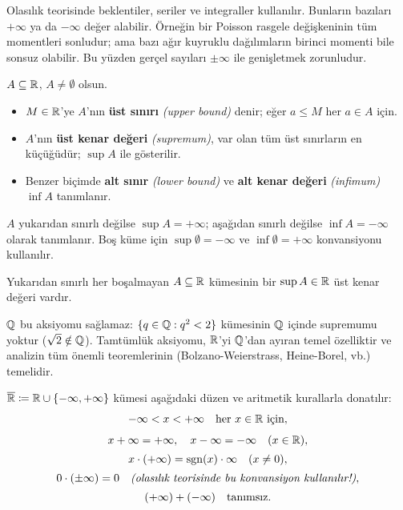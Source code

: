 \begin{motivasyon}[§0.4]
Olasılık teorisinde beklentiler, seriler ve integraller kullanılır. Bunların
bazıları $+\infty$ ya da $-\infty$ değer alabilir. Örneğin bir Poisson rasgele
değişkeninin tüm momentleri sonludur; ama bazı ağır kuyruklu dağılımların birinci
momenti bile sonsuz olabilir. Bu yüzden gerçel sayıları $\pm\infty$ ile
genişletmek zorunludur.
\end{motivasyon}

\begin{tanim}\label{def:supinf}
$A \subseteq \mathbb{R}$, $A \neq \emptyset$ olsun.
\begin{itemize}
  \item $M \in \mathbb{R}$'ye $A$'nın \textbf{üst sınırı} \emph{(upper bound)} denir;
        eğer $a \leq M$ her $a \in A$ için.
  \item $A$'nın \textbf{üst kenar değeri} \emph{(supremum)}, var olan tüm üst
        sınırların en küçüğüdür; $\sup A$ ile gösterilir.
  \item Benzer biçimde \textbf{alt sınır} \emph{(lower bound)} ve
        \textbf{alt kenar değeri} \emph{(infimum)} $\inf A$ tanımlanır.
\end{itemize}
$A$ yukarıdan sınırlı değilse $\sup A = +\infty$; aşağıdan sınırlı değilse
$\inf A = -\infty$ olarak tanımlanır. Boş küme için $\sup \emptyset = -\infty$
ve $\inf \emptyset = +\infty$ konvansiyonu kullanılır.
\end{tanim}

\begin{aksiyom}
\label{ax:tamtumluk}
Yukarıdan sınırlı her boşalmayan $A \subseteq \mathbb{R}$ kümesinin bir
$\sup A \in \mathbb{R}$ üst kenar değeri vardır.
\end{aksiyom}

\begin{notkutu}
$\mathbb{Q}$ bu aksiyomu sağlamaz: $\{q \in \mathbb{Q} : q^2 < 2\}$ kümesinin
$\mathbb{Q}$ içinde supremumu yoktur ($\sqrt{2} \notin \mathbb{Q}$).
Tamtümlük aksiyomu, $\mathbb{R}$'yi $\mathbb{Q}$'dan ayıran temel özelliktir ve
analizin tüm önemli teoremlerinin (Bolzano-Weierstrass, Heine-Borel, vb.) temelidir.
\end{notkutu}

\begin{tanim}\label{def:Rbar}
$\overline{\mathbb{R}} \coloneqq \mathbb{R} \cup \{-\infty, +\infty\}$ kümesi
aşağıdaki düzen ve aritmetik kurallarla donatılır:
\begin{gather*}
  -\infty < x < +\infty \quad \text{her } x \in \mathbb{R} \text{ için},\\[4pt]
  x + \infty = +\infty, \quad
  x - \infty = -\infty \quad (x \in \mathbb{R}), \\[2pt]
  x \cdot (+\infty) = \operatorname{sgn}(x) \cdot \infty \quad (x \neq 0), \\[2pt]
  0 \cdot (\pm\infty) = 0
  \quad \text{\emph{(olasılık teorisinde bu konvansiyon kullanılır!)}}, \\[2pt]
  (+\infty) + (-\infty) \quad \text{tanımsız.}
\end{gather*}
\end{tanim}

